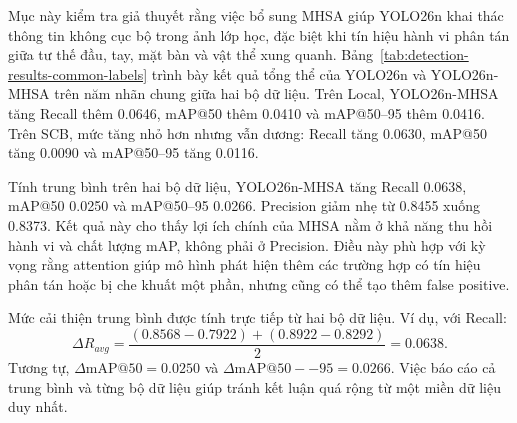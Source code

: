 Mục này kiểm tra giả thuyết rằng việc bổ sung MHSA giúp YOLO26n khai thác thông tin không cục bộ trong ảnh lớp học, đặc biệt khi tín hiệu hành vi phân tán giữa tư thế đầu, tay, mặt bàn và vật thể xung quanh. Bảng~\ref{tab:detection-results-common-labels} trình bày kết quả tổng thể của YOLO26n và YOLO26n-MHSA trên năm nhãn chung giữa hai bộ dữ liệu. Trên Local, YOLO26n-MHSA tăng Recall thêm 0.0646, mAP@50 thêm 0.0410 và mAP@50--95 thêm 0.0416. Trên SCB, mức tăng nhỏ hơn nhưng vẫn dương: Recall tăng 0.0630, mAP@50 tăng 0.0090 và mAP@50--95 tăng 0.0116.

\begin{table}[htbp]
\centering
\caption{Hiệu năng YOLO26n và YOLO26n-MHSA trên năm nhãn chung.}
\label{tab:detection-results-common-labels}
\end{table}

Tính trung bình trên hai bộ dữ liệu, YOLO26n-MHSA tăng Recall 0.0638, mAP@50 0.0250 và mAP@50--95 0.0266. Precision giảm nhẹ từ 0.8455 xuống 0.8373. Kết quả này cho thấy lợi ích chính của MHSA nằm ở khả năng thu hồi hành vi và chất lượng mAP, không phải ở Precision. Điều này phù hợp với kỳ vọng rằng attention giúp mô hình phát hiện thêm các trường hợp có tín hiệu phân tán hoặc bị che khuất một phần, nhưng cũng có thể tạo thêm false positive.

Mức cải thiện trung bình được tính trực tiếp từ hai bộ dữ liệu. Ví dụ, với Recall:
\begin{equation}
\label{eq:average-recall-gain}
    \Delta R_{avg}=\frac{(0.8568-0.7922)+(0.8922-0.8292)}{2}=0.0638.
\end{equation}
Tương tự, \(\Delta\mathrm{mAP@50}=0.0250\) và \(\Delta\mathrm{mAP@50--95}=0.0266\). Việc báo cáo cả trung bình và từng bộ dữ liệu giúp tránh kết luận quá rộng từ một miền dữ liệu duy nhất.

